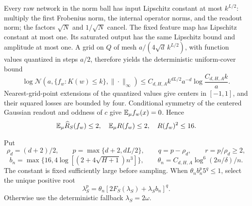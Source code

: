 Every raw network in the norm ball has input Lipschitz constant at most $k^{L/2}$: multiply the first Frobenius norm, the internal operator norms, and the readout norm; the factors $\sqrt N$ and $1/\sqrt N$ cancel. The fixed feature map has Lipschitz constant at most one. Its saturated output has the same Lipschitz bound and amplitude at most one. A grid on $Q$ of mesh $a/(4\sqrt d\,k^{L/2})$, with function values quantized in steps $a/2$, therefore yields the deterministic uniform-cover bound
\begin{equation}
 \log\mathcal N(a,\{f_w:K(w)\le k\},\|\cdot\|_\infty)
 \le C_{d,H,A} k^{dL/2}a^{-d}\log\frac{C_{d,H,A}k}a.
 \label{eq:saturated-cover}
\end{equation}
Nearest-grid-point extensions of the quantized values give centers in $[-1,1]$, and their squared losses are bounded by four. Conditional symmetry of the centered Gaussian readout and oddness of $c$ give $\mathbb E_\mu f_w(x)=0$. Hence
\[
 \mathbb E_\mu\widehat R_S(f_w)\le2,\quad
 \mathbb E_\mu R(f_w)\le2,\quad R(f_w)^2\le16.
\]

Put
\[
 \rho_d=(d+2)/2,\qquad
 p=\max\{d+2,dL/2\},\qquad q=p-\rho_d,\qquad r=p/\rho_d\ge2,
\]
\[
 b_n=\max\{16,4\log[(2+4\sqrt{H+1})n^3]\},\qquad
 \theta_n=C_{d,H,A}\log^6(2n/\delta)/n.
\]
The constant is fixed sufficiently large before sampling. When
$\theta_n b_n^p5^q\le1$, select the unique positive root
\begin{equation}
 \lambda_S^p=\theta_n[2F_S(\lambda_S)+\lambda_S b_n]^q.
 \label{eq:saturated-calibration}
\end{equation}
Otherwise use the deterministic fallback $\lambda_S=2\omega$.

